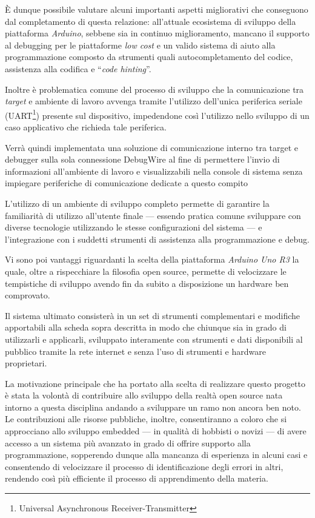 È dunque possibile valutare alcuni importanti aspetti migliorativi che conseguono dal completamento di questa relazione: all'attuale ecosistema di sviluppo della piattaforma \textit{Arduino}, sebbene sia in continuo miglioramento, mancano il supporto al debugging per le piattaforme \textit{low cost} e un valido sistema di aiuto alla programmazione composto da strumenti quali autocompletamento del codice, assistenza alla codifica e ``\textit{code hinting}''.

Inoltre è problematica comune del processo di sviluppo che la comunicazione tra \textit{target} e ambiente di lavoro avvenga tramite l'utilizzo dell'unica periferica seriale (UART\footnote{Universal Asynchronous Receiver-Transmitter}) presente sul dispositivo, impedendone così l'utilizzo nello sviluppo di un caso applicativo che richieda tale periferica.

Verrà quindi implementata una soluzione di comunicazione interno tra target e debugger sulla sola connessione DebugWire al fine di permettere l'invio di informazioni all'ambiente di lavoro e visualizzabili nella console di sistema senza impiegare periferiche di comunicazione dedicate a questo compito

L'utilizzo di un ambiente di sviluppo completo permette di garantire la familiarità di utilizzo all'utente finale --- essendo pratica comune sviluppare con diverse tecnologie utilizzando le stesse configurazioni del sistema --- e l'integrazione con i suddetti strumenti di assistenza alla programmazione e debug.

Vi sono poi vantaggi riguardanti la scelta della piattaforma \textit{Arduino Uno R3} la quale, oltre a rispecchiare la filosofia open source, permette di velocizzare le tempistiche di sviluppo avendo fin da subito a disposizione un hardware ben comprovato\cite{site:arduino-mini-le}.

Il sistema ultimato consisterà in un set di strumenti complementari e modifiche apportabili alla scheda sopra descritta in modo che chiunque sia in grado di utilizzarli e applicarli, sviluppato interamente con strumenti e dati disponibili al pubblico tramite la rete internet e senza l'uso di strumenti e hardware proprietari.

La motivazione principale che ha portato alla scelta di realizzare questo progetto è stata la volontà di contribuire allo sviluppo della realtà open source nata intorno a questa disciplina andando a sviluppare un ramo non ancora ben noto. 
Le contribuzioni alle risorse pubbliche, inoltre, consentiranno a coloro che si approcciano allo sviluppo embedded --- in qualità di hobbisti o novizi --- di avere accesso a un sistema più avanzato in grado di offrire supporto alla programmazione, sopperendo dunque alla mancanza di esperienza in alcuni casi e consentendo di velocizzare il processo di identificazione degli errori in altri, rendendo così più efficiente il processo di apprendimento della materia.